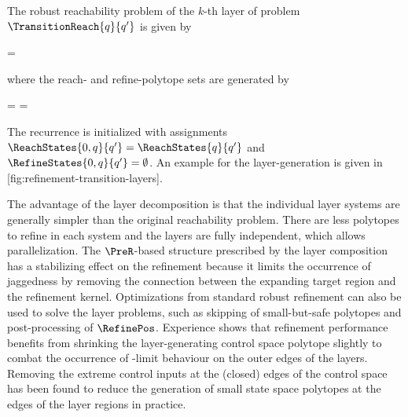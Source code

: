     The robust reachability problem of the $k$-th layer of problem $\TransitionReach{q}{q'}$ is given by

    \startformula
         = 
    \stopformula

    where the reach- and refine-polytope sets are generated by

    \startformula
        \startalign[n=2,align={right,left}]
            \NC {} =
            \NC {} \cup {} \quad\EndAnd
            \NR
            \NC {} =
            \NC {} \EndPeriod
            \NR
        \stopalign
    \stopformula

    The recurrence is initialized with assignments $\ReachStates{0, q}{q'} = \ReachStates{q}{q'}$ and $\RefineStates{0, q}{q'} = \emptyset$.
    An example for the layer-generation is given in [fig:refinement-transition-layers].

    The advantage of the layer decomposition is that the individual layer systems are generally simpler than the original reachability problem.
    There are less polytopes to refine in each system and the layers are fully independent, which allows parallelization.
    The $\PreR$-based structure prescribed by the layer composition has a stabilizing effect on the refinement because it limits the occurrence of jaggedness by removing the connection between the expanding target region and the refinement kernel.
    Optimizations from standard robust refinement can also be used to solve the layer problems, such as skipping of small-but-safe polytopes and post-processing of $\RefinePos$.
    Experience shows that refinement performance benefits from shrinking the layer-generating control space polytope slightly to combat the occurrence of \epsilon-limit behaviour on the outer edges of the layers.
    Removing the extreme control inputs at the (closed) edges of the control space has been found to reduce the generation of small state space polytopes at the edges of the layer regions in practice.



